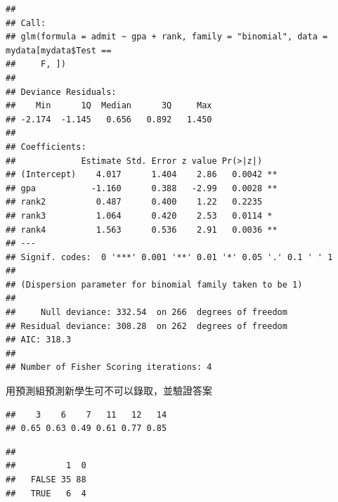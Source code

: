 \documentclass[]{book}
\newenvironment{Shaded}{\begin{snugshade}}{\end{snugshade}}
\newcommand{\CommentTok}[1]{\textcolor[rgb]{0.56,0.35,0.01}{\textit{#1}}}
\newcommand{\DataTypeTok}[1]{\textcolor[rgb]{0.13,0.29,0.53}{#1}}
\newcommand{\FloatTok}[1]{\textcolor[rgb]{0.00,0.00,0.81}{#1}}
\newcommand{\KeywordTok}[1]{\textcolor[rgb]{0.13,0.29,0.53}{\textbf{#1}}}
\newcommand{\NormalTok}[1]{#1}
\newcommand{\OperatorTok}[1]{\textcolor[rgb]{0.81,0.36,0.00}{\textbf{#1}}}
\newcommand{\StringTok}[1]{\textcolor[rgb]{0.31,0.60,0.02}{#1}}
\begin{document}
\begin{verbatim}
## 
## Call:
## glm(formula = admit ~ gpa + rank, family = "binomial", data = mydata[mydata$Test == 
##     F, ])
## 
## Deviance Residuals: 
##    Min      1Q  Median      3Q     Max  
## -2.174  -1.145   0.656   0.892   1.450  
## 
## Coefficients:
##             Estimate Std. Error z value Pr(>|z|)   
## (Intercept)    4.017      1.404    2.86   0.0042 **
## gpa           -1.160      0.388   -2.99   0.0028 **
## rank2          0.487      0.400    1.22   0.2235   
## rank3          1.064      0.420    2.53   0.0114 * 
## rank4          1.563      0.536    2.91   0.0036 **
## ---
## Signif. codes:  0 '***' 0.001 '**' 0.01 '*' 0.05 '.' 0.1 ' ' 1
## 
## (Dispersion parameter for binomial family taken to be 1)
## 
##     Null deviance: 332.54  on 266  degrees of freedom
## Residual deviance: 308.28  on 262  degrees of freedom
## AIC: 318.3
## 
## Number of Fisher Scoring iterations: 4
\end{verbatim}

用預測組預測新學生可不可以錄取，並驗證答案

\begin{Shaded}
\end{Shaded}

\begin{verbatim}
##    3    6    7   11   12   14 
## 0.65 0.63 0.49 0.61 0.77 0.85
\end{verbatim}

\begin{Shaded}
\end{Shaded}

\begin{verbatim}
##        
##          1  0
##   FALSE 35 88
##   TRUE   6  4
\end{verbatim}
\end{document}

